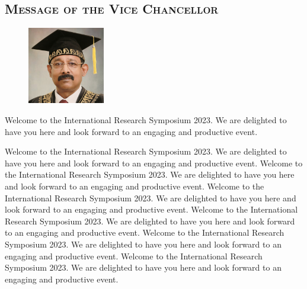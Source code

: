 



\thispagestyle{fancy}
	
	\begin{center}



\subsection*{\textsc{Message of the Vice Chancellor}}
	\end{center}

   
    
    \begin{figure}
		\includegraphics[width=0.3\textwidth]{Images/VC.png}
	\end{figure}




	
	
	Welcome to the International Research Symposium 2023. We are delighted to have you here and look forward to an engaging and productive event. 
	
	Welcome to the International Research Symposium 2023. We are delighted to have you here and look forward to an engaging and productive event. Welcome to the International Research Symposium 2023. We are delighted to have you here and look forward to an engaging and productive event. Welcome to the International Research Symposium 2023. We are delighted to have you here and look forward to an engaging and productive event. Welcome to the International Research Symposium 2023. We are delighted to have you here and look forward to an engaging and productive event. Welcome to the International Research Symposium 2023. We are delighted to have you here and look forward to an engaging and productive event. Welcome to the International Research Symposium 2023. We are delighted to have you here and look forward to an engaging and productive event. 
	
